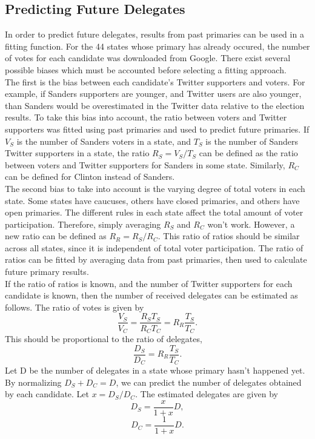 \documentclass[12pt]{extarticle}
\begin{document}
\subsection{Predicting Future Delegates}
In order to predict future delegates, results from past primaries can be used in a fitting function.
For the 44 states whose primary has already occured, the number of votes for each candidate was downloaded from Google.
There exist several possible biases which must be accounted before selecting a fitting approach.
\\
\indent
The first is the bias between each candidate's Twitter supporters and voters.
For example, if Sanders supporters are younger, and Twitter users are also younger, than Sanders would be overestimated in the Twitter data relative to the election results.
To take this bias into account, the ratio between voters and Twitter supporters was fitted using past primaries and used to predict future primaries.
If $V_S$ is the number of Sanders voters in a state, and $T_S$ is the number of Sanders Twitter supporters in a state, the ratio $R_S = V_S / T_S$ can be defined as the ratio between voters and Twitter supporters for Sanders in some state.
Similarly, $R_C$ can be defined for Clinton instead of Sanders.
\\
\indent
The second bias to take into account is the varying degree of total voters in each state.
Some states have caucuses, others have closed primaries, and others have open primaries.
The different rules in each state affect the total amount of voter participation.
Therefore, simply averaging $R_S$ and $R_C$ won't work.
However, a new ratio can be defined as $R_R = R_S / R_C$.
This ratio of ratios should be similar across all states, since it is independent of total voter participation.
The ratio of ratios can be fitted by averaging data from past primaries, then used to calculate future primary results.
\\
\indent
If the ratio of ratios is known, and the number of Twitter supporters for each candidate is known, then the number of received delegates can be estimated as follows.
The ratio of votes is given by
\begin{equation}
\frac{V_S}{V_C} = \frac{R_S T_S}{R_C T_C} = R_R \frac{T_S}{T_C}.
\end{equation}
This should be proportional to the ratio of delegates,
\begin{equation}
\frac{D_S}{D_C} = R_R \frac{T_S}{T_C}.
\end{equation}
Let D be the number of delegates in a state whose primary hasn't happened yet.
By normalizing $D_S + D_C = D$, we can predict the number of delegates obtained by each candidate.
Let $x = D_S / D_C$.
The estimated delegates are given by
\begin{equation}
D_S = \frac{x}{1+x} D,
\end{equation}
\begin{equation}
D_C = \frac{1}{1+x} D.
\end{equation}
\end{document}
